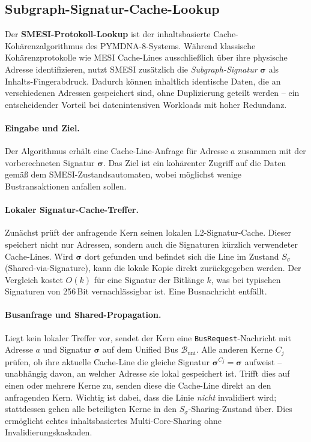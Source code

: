 ﻿\documentclass[a4paper,12pt]{article}
\theoremstyle{definition}
\begin{document}
\subsection{Subgraph-Signatur-Cache-Lookup}

Der \textbf{SMESI-Protokoll-Lookup} ist der inhaltsbasierte Cache-Kohärenzalgorithmus des PYMDNA-8-Systems. Während klassische Kohärenzprotokolle wie MESI Cache-Lines ausschließlich über ihre physische Adresse identifizieren, nutzt SMESI zusätzlich die \emph{Subgraph-Signatur} $\boldsymbol{\sigma}$ als Inhalts-Fingerabdruck. Dadurch können inhaltlich identische Daten, die an verschiedenen Adressen gespeichert sind, ohne Duplizierung geteilt werden -- ein entscheidender Vorteil bei datenintensiven Workloads mit hoher Redundanz.

\paragraph{Eingabe und Ziel.}
Der Algorithmus erhält eine Cache-Line-Anfrage für Adresse $a$ zusammen mit der vorberechneten Signatur $\boldsymbol{\sigma}$. Das Ziel ist ein kohärenter Zugriff auf die Daten gemäß dem SMESI-Zustandsautomaten, wobei möglichst wenige Bustransaktionen anfallen sollen.

\paragraph{Lokaler Signatur-Cache-Treffer.}
Zunächst prüft der anfragende Kern seinen lokalen L2-Signatur-Cache. Dieser speichert nicht nur Adressen, sondern auch die Signaturen kürzlich verwendeter Cache-Lines. Wird $\boldsymbol{\sigma}$ dort gefunden und befindet sich die Line im Zustand $S_\sigma$ (Shared-via-Signature), kann die lokale Kopie direkt zurückgegeben werden. Der Vergleich kostet $O(k)$ für eine Signatur der Bitlänge $k$, was bei typischen Signaturen von 256\,Bit vernachlässigbar ist. Eine Busnachricht entfällt.

\paragraph{Busanfrage und Shared-Propagation.}
Liegt kein lokaler Treffer vor, sendet der Kern eine \texttt{BusRequest}-Nachricht mit Adresse $a$ und Signatur $\boldsymbol{\sigma}$ auf dem Unified Bus $\mathcal{B}_{\mathrm{uni}}$. Alle anderen Kerne $C_j$ prüfen, ob ihre aktuelle Cache-Line die gleiche Signatur $\boldsymbol{\sigma}^{C_j} = \boldsymbol{\sigma}$ aufweist -- unabhängig davon, an welcher Adresse sie lokal gespeichert ist. Trifft dies auf einen oder mehrere Kerne zu, senden diese die Cache-Line direkt an den anfragenden Kern. Wichtig ist dabei, dass die Linie \emph{nicht} invalidiert wird; stattdessen gehen alle beteiligten Kerne in den $S_\sigma$-Sharing-Zustand über. Dies ermöglicht echtes inhaltsbasiertes Multi-Core-Sharing ohne Invalidierungskaskaden.
\end{document}
